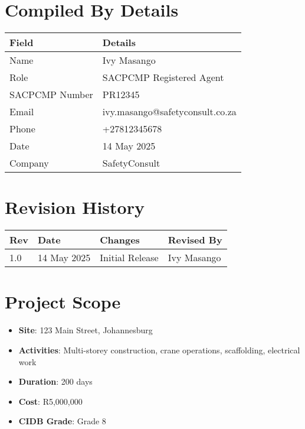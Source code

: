 \documentclass[11pt]{article}
\makeatletter
\newcommand{\issueDate}{14 May 2025}
\newcommand{\compilerName}{Ivy Masango}
\newcommand{\compilerRole}{SACPCMP Registered Agent}
\newcommand{\compilerSACPCMP}{PR12345}
\newcommand{\compilerEmail}{ivy.masango@safetyconsult.co.za}
\newcommand{\compilerPhone}{+27812345678}
\newcommand{\compilerCompany}{SafetyConsult}
\newcommand{\projectDuration}{200 days}
\newcommand{\projectCost}{R5,000,000}
\newcommand{\cidbGrade}{Grade 8}
\makeatother
\begin{document}
\section{Compiled By Details}
\begin{tabularx}{\textwidth}{lX}
  \toprule
  \textbf{Field} & \textbf{Details} \\
  \midrule
  Name & \compilerName \\
  Role & \compilerRole \\
  SACPCMP Number & \compilerSACPCMP \\
  Email & \compilerEmail \\
  Phone & \compilerPhone \\
  Date & \issueDate \\
  Company & \compilerCompany \\
  \bottomrule
\end{tabularx}

\section{Revision History}
\begin{tabularx}{\textwidth}{lXll}
  \toprule
  \textbf{Rev} & \textbf{Date} & \textbf{Changes} & \textbf{Revised By} \\
  \midrule
  1.0 & \issueDate & Initial Release & \compilerName \\
  \bottomrule
\end{tabularx}

\section{Project Scope}
\begin{itemize}
  \item \textbf{Site}: 123 Main Street, Johannesburg
  \item \textbf{Activities}: Multi-storey construction, crane operations, scaffolding, electrical work
  \item \textbf{Duration}: \projectDuration
  \item \textbf{Cost}: \projectCost
  \item \textbf{CIDB Grade}: \cidbGrade
\end{itemize}
\end{document}
